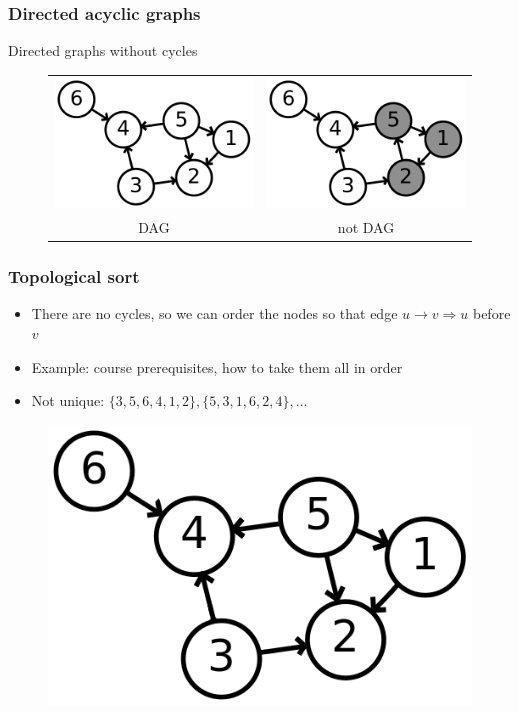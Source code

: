 \documentclass[12pt]{beamer}
\begin{document}
\begin{frame}
\frametitle{Directed acyclic graphs}
Directed graphs without cycles
\begin{figure}
\centering
\begin{tabular}{cc}
\includegraphics[width=0.4\linewidth]{img/6n-dag}
& \includegraphics[width=0.4\linewidth]{img/6n-not-dag} \\
DAG & not DAG
\end{tabular}
\end{figure}
\end{frame}

\begin{frame}
\frametitle{Topological sort}
\begin{itemize}
\item There are no cycles, so we can order the nodes so that edge $u \to v \Rightarrow  u$ before $v$
\item Example: course prerequisites, how to take them all in order
\item Not unique: $\{3,5,6,4,1,2\}, \{5,3,1,6,2,4\},\ldots$
\end{itemize}
\begin{figure}
\centering
\includegraphics[width=.5\linewidth]{img/6n-dag}
\end{figure}
\end{frame}
\end{document}
